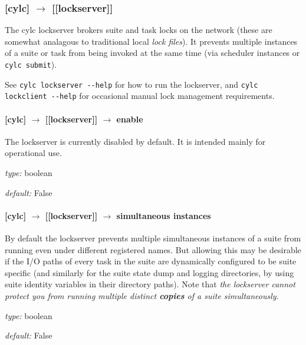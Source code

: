 \subsubsection[{[[}lockserver{]]}]{[cylc] $\rightarrow$ [[lockserver]]}

The cylc lockserver brokers suite and task locks on the network (these
are somewhat analagous to traditional local {\em lock files}). It
prevents multiple instances of a suite or task from being invoked 
at the same time (via scheduler instances or \lstinline=cylc submit=).
 
See \lstinline=cylc lockserver --help= for 
how to run the lockserver, and \lstinline=cylc lockclient --help= for 
occasional manual lock management requirements. 

\paragraph[enable]{[cylc] $\rightarrow$ [[lockserver]] $\rightarrow$ enable}

The lockserver is currently disabled by default. It is intended mainly for
operational use.

\begin{myitemize}
    \item {\em type:} boolean
    \item {\em default:} False
\end{myitemize}

\paragraph[simultaneous instances]{[cylc] $\rightarrow$ [[lockserver]] $\rightarrow$ simultaneous instances}

By default the lockserver prevents multiple simultaneous instances of a
suite from running even under different registered names. But allowing
this may be desirable if the I/O paths of every task in the suite are
dynamically configured to be suite specific (and similarly for the suite
state dump and logging directories, by using suite identity variables in
their directory paths). Note that {\em the lockserver cannot protect you
from running multiple distinct {\bf copies} of a suite simultaneously}. 

\begin{myitemize}
    \item {\em type:} boolean
    \item {\em default:} False
\end{myitemize}

